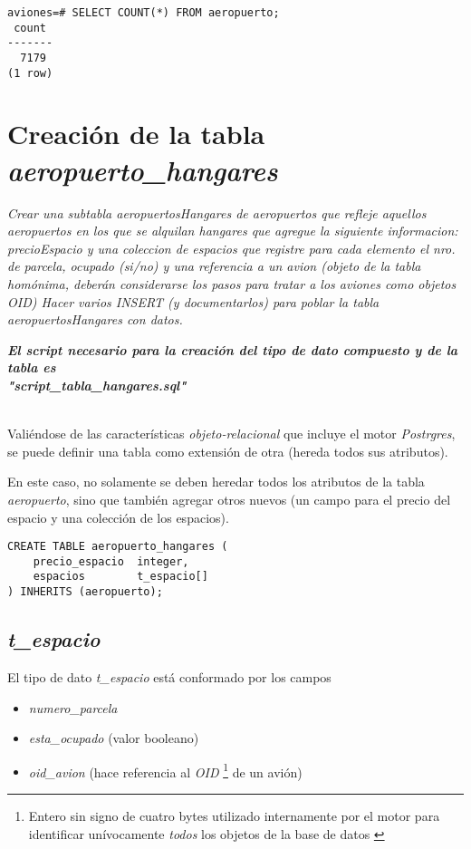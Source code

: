 \vspace*{5mm}
\lstset{style=sql}
\begin{lstlisting}
aviones=# SELECT COUNT(*) FROM aeropuerto;
 count 
-------
  7179
(1 row)
\end{lstlisting}

\section{Creación de la tabla \emph{aeropuerto\_hangares}}

\emph{Crear una subtabla aeropuertosHangares de aeropuertos que refleje aquellos aeropuertos en los que se alquilan hangares que agregue la siguiente informacion: precioEspacio y una coleccion de espacios que registre para cada elemento el nro. de parcela, ocupado (si/no) y una referencia a un avion (objeto de la tabla homónima, deberán considerarse los pasos para tratar a los aviones como objetos OID) Hacer varios INSERT (y documentarlos) para poblar la tabla aeropuertosHangares con datos.} 

\emph{\textbf{El script necesario para la creación del tipo de dato compuesto y de la tabla es \\ "script\_tabla\_hangares.sql"}} 

~\\


Valiéndose de las características \emph{objeto-relacional} que incluye el motor \emph{Postrgres}, se puede definir una tabla como extensión de otra (hereda todos sus atributos).

En este caso, no solamente se deben heredar todos los atributos de la tabla \emph{aeropuerto}, sino que también agregar otros nuevos (un campo para el precio del espacio y una colección de los espacios). 

\vspace*{5mm}
\lstset{style=sql}
\begin{lstlisting}
CREATE TABLE aeropuerto_hangares (
    precio_espacio  integer,
    espacios        t_espacio[]
) INHERITS (aeropuerto);
\end{lstlisting}

\subsection{\emph{t\_espacio}}

El tipo de dato \emph{t\_espacio} está conformado por los campos
\begin{itemize}
    \item \emph{numero\_parcela} 
    \item \emph{esta\_ocupado} (valor booleano) 
    \item \emph{oid\_avion} (hace referencia al \emph{OID} \footnote{Entero sin signo de cuatro bytes utilizado internamente por el motor para identificar unívocamente \emph{todos} los objetos de la base de datos \cite{oid}} de un avión)
\end{itemize}

